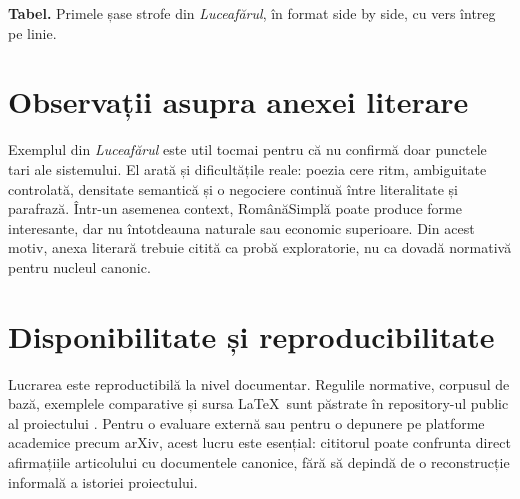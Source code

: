 \documentclass[12pt,onecolumn,letterpaper]{article}
\begin{document}
\normalsize

\begin{center}
\small\textbf{Tabel.} Primele șase strofe din \textit{Luceafărul}, în format side by side, cu vers întreg pe linie.
\end{center}

\section{Observații asupra anexei literare}

Exemplul din \textit{Luceafărul} este util tocmai pentru că nu confirmă doar
punctele tari ale sistemului. El arată și dificultățile reale: poezia cere ritm,
ambiguitate controlată, densitate semantică și o negociere continuă între
literalitate și parafrază. Într-un asemenea context, RomânăSimplă poate produce
forme interesante, dar nu întotdeauna naturale sau economic superioare. Din
acest motiv, anexa literară trebuie citită ca probă exploratorie, nu ca dovadă
normativă pentru nucleul canonic.

\section{Disponibilitate și reproducibilitate}

Lucrarea este reproductibilă la nivel documentar. Regulile normative, corpusul
de bază, exemplele comparative și sursa \LaTeX\ sunt păstrate în repository-ul
public al proiectului \cite{rs-repo}. Pentru o evaluare externă sau pentru o
depunere pe platforme academice precum arXiv, acest lucru este esențial: cititorul
poate confrunta direct afirmațiile articolului cu documentele canonice, fără să
depindă de o reconstrucție informală a istoriei proiectului.
\end{document}
